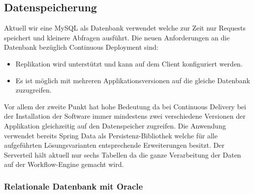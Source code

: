 \subsection{Datenspeicherung}
\label{ent-db}
Aktuell wir eine MySQL als Datenbank verwendet welche zur Zeit nur Requests speichert und kleinere Abfragen ausführt. Die neuen Anforderungen an die Datenbank bezüglich Continuous Deployment sind:
\begin{itemize}
	\item Replikation wird unterstützt und kann auf dem Client konfiguriert werden.
	\item Es ist möglich mit mehreren Applikationsversionen auf die gleiche Datenbank zuzugreifen.
\end{itemize}
Vor allem der zweite Punkt hat hohe Bedeutung da bei Continuous Delivery bei der Installation der Software immer mindestens zwei verschiedene Versionen der Applikation gleichzeitig auf den Datenspeicher zugreifen. Die Anwendung verwendet bereits Spring Data als Persistenz-Bibliothek welche für alle aufgeführten Lösungsvarianten entsprechende Erweiterungen besitzt. Der Serverteil hält aktuell nur sechs Tabellen da die ganze Verarbeitung der Daten auf der Workflow-Engine gemacht wird.

\subsubsection{Relationale Datenbank mit Oracle}

